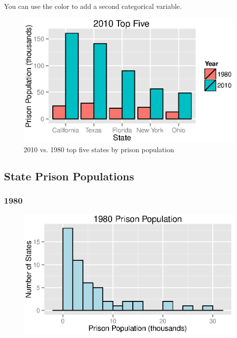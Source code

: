 \documentclass{exam}
\begin{document}
  You can use the color to add a second categorical variable.
  \begin{figure}[H]
    \centering
    \includegraphics[scale = 0.9]{figures/1980_to_2010_top_five.eps}
    \caption{2010 vs. 1980 top five states by prison population}
  \end{figure}

  \subsection{State Prison Populations}
  \subsubsection{1980}
  \begin{figure}[H]
    \centering
    \includegraphics[scale = 0.9]{1980_pp_histogram.eps}
  \end{figure}
\end{document}

